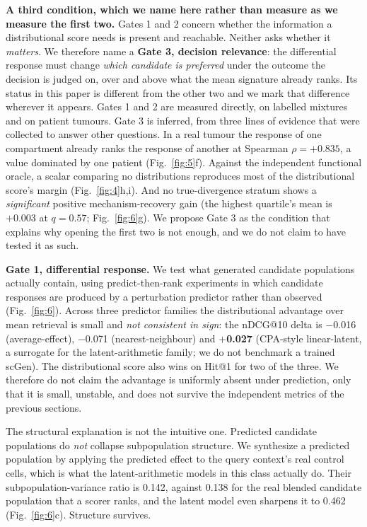 \documentclass[11pt,letterpaper]{article}
\newcommand{\PREMISEDISJOINT}{+0.835}
\begin{document}
\textbf{A third condition, which we name here rather than measure as we measure the first two.}
Gates 1 and 2 concern whether the information a distributional score needs is present and
reachable. Neither asks whether it \emph{matters}. We therefore name a \textbf{Gate 3, decision
relevance}: the differential response must change \emph{which candidate is preferred} under the
outcome the decision is judged on, over and above what the mean signature already ranks. Its
status in this paper is different from the other two and we mark that difference wherever it
appears. Gates 1 and 2 are measured directly, on labelled mixtures and on patient tumours. Gate 3
is inferred, from three lines of evidence that were collected to answer other questions. In a real
tumour the response of one compartment already ranks the response of another at Spearman
$\rho = \PREMISEDISJOINT$, a value dominated by one patient (Fig.~\ref{fig:5}f). Against the
independent functional oracle, a scalar comparing no distributions reproduces most of the
distributional score's margin (Fig.~\ref{fig:4}h,i). And no true-divergence stratum shows a
\emph{significant} positive mechanism-recovery gain (the highest quartile's mean is $+0.003$ at
$q = 0.57$; Fig.~\ref{fig:6}g). We propose Gate 3 as the condition that
explains why opening the first two is not enough, and we do not claim to have tested it as such.

\textbf{Gate 1, differential response.} We test what generated candidate populations actually
contain, using predict-then-rank experiments in which candidate responses are produced by a
perturbation predictor rather than observed (Fig.~\ref{fig:6}). Across three predictor families
the distributional advantage over mean retrieval is small and \emph{not consistent in sign}: the
nDCG@10 delta is $-$0.016 (average-effect), $-$0.071 (nearest-neighbour) and \textbf{$+$0.027}
(CPA-style linear-latent, a surrogate for the latent-arithmetic family; we do not benchmark a
trained scGen). The distributional score also wins on Hit@1 for two of the three. We therefore do not claim the
advantage is uniformly absent under prediction, only that it is small, unstable, and does not
survive the independent metrics of the previous sections.

The structural explanation is not the intuitive one. Predicted candidate populations do
\emph{not} collapse subpopulation structure. We synthesize a predicted population by
applying the predicted effect to the query context's real control cells, which is what the
latent-arithmetic models in this class actually do. Their subpopulation-variance ratio is 0.142,
against 0.138 for the real blended candidate population that a scorer ranks, and the latent model
even sharpens it to 0.462 (Fig.~\ref{fig:6}c). Structure survives.
\end{document}
